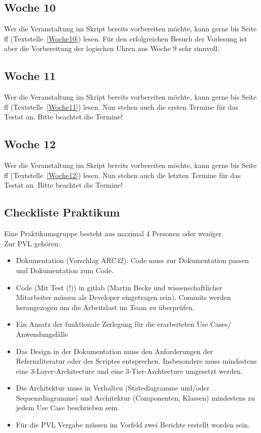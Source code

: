 \subsection{Woche 10}
Wer die Veranstaltung im Skript bereits vorbereiten möchte, kann gerne bis Seite \pageref{Woche10}ff (Textstelle~\ref{Woche10}) lesen. Für den erfolgreichen Besuch der Vorlesung ist aber die Vorbereitung der logischen Uhren aus Woche 9 sehr sinnvoll. 

\subsection{Woche 11}
Wer die Veranstaltung im Skript bereits vorbereiten möchte, kann gerne bis Seite \pageref{Woche11}ff (Textstelle~\ref{Woche11}) lesen.
Nun stehen auch die ersten Termine für das Testat an. Bitte beachtet die Termine!

\subsection{Woche 12}
Wer die Veranstaltung  im Skript bereits vorbereiten möchte, kann gerne bis Seite \pageref{Woche12}ff (Textstelle~\ref{Woche12}) lesen.
Nun stehen auch die letzten Termine für das Testat an. Bitte beachtet die Termine!

\subsection{Checkliste Praktikum}

Eine Praktikumsgruppe besteht aus maximal 4 Personen oder weniger.\\
Zur PVL gehören:
\begin{itemize}
\item Dokumentation (Vorschlag ARC42): Code muss zur Dokumentation passen und Dokumentation zum Code. 
\item Code (Mit Test (!)) in gitlab (Martin Becke und wissenschaftlicher Mitarbeiter müssen als Developer eingetragen sein). Commits werden herangezogen um die Arbeitslast im Team zu überprüfen.
\item Ein Ansatz der funktionale Zerlegung für die erarbeiteten Use Cases/ Anwendungsfälle
\item Das Design in der Dokumentation muss den Anforderungen der Refernzliteratur oder des Scriptes entsprechen. Insbesondere muss mindestens eine 3-Layer-Architecture und eine 3-Tier-Archtecture umgesetzt werden.
\item Die Architektur muss in Verhalten (Statediagramme und/oder Sequenzdiagramme) und Architektur (Componenten, Klassen) mindestens zu jedem Use Case beschrieben sein.
\item Für die PVL Vergabe müssen im Vorfeld zwei Berichte erstellt worden sein.  
\end{itemize}

	

	

	

	



 

